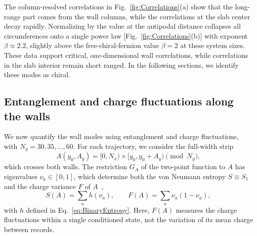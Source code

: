 \documentclass[aps,prb,10pt,twocolumn,superscriptaddress,longbibliography,floatfix]{revtex4-2}
\newcommand{\newtext}[1]{{\color{blue}#1}}
\begin{document}
\newtext{The column-resolved correlations in Fig.~\ref{fig:Correlations}(a) show that the long-range part comes from the wall columns, while the correlations at the slab center decay rapidly.} Normalizing by the value at the antipodal distance collapses all circumferences onto a single power law [Fig.~\ref{fig:Correlations}(b)] with exponent $\beta\approx2.2$, slightly above the free-chiral-fermion value $\beta=2$ at these system sizes. \newtext{These data support critical, one-dimensional wall correlations, while correlations in the slab interior remain short ranged.} In the following sections, we identify these modes as chiral.

\subsection{Entanglement and charge fluctuations along the walls}
\label{sec:Entanglement}

{\color{blue}
We now quantify the wall modes using entanglement and charge fluctuations, with $N_y=30,35,\ldots,60$. For each trajectory, we consider the full-width strip
\begin{equation}
    A(y_0,A_y)=[0,N_x)\times[y_0,y_0+A_y)\pmod{N_y},
    \label{eq:Strip}
\end{equation}
which crosses both walls. The restriction $G_A$ of the two-point function to $A$ has eigenvalues $\nu_a\in[0,1]$, which determine both the von Neumann entropy $S\equiv S_1$ and the charge variance $F$ of $A$~\cite{KlichLevitov2009,SongFlindtRachel2011},
\begin{equation}
    S(A)=\sum_a h(\nu_a),
    \qquad
    F(A)=\sum_a\nu_a(1-\nu_a),
    \label{eq:EntropyVariance}
\end{equation}
\newtext{with $h$ defined in Eq.~\eqref{eq:BinaryEntropy}.}
Here, $F(A)$ measures the charge fluctuations within a single conditioned state, not the variation of its mean charge between records.
}
\end{document}
